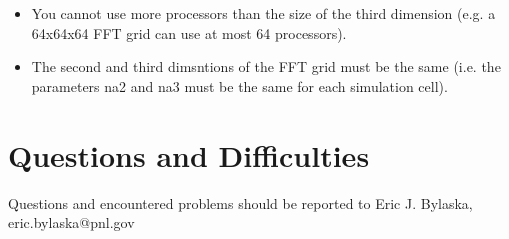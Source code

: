 \begin{itemize}
\item You cannot use more processors than the size of the third dimension (e.g. a 64x64x64 FFT grid
      can use at most 64 processors).
\item The second and third dimsntions of the FFT grid must be the same (i.e. the parameters na2 and 
      na3 must be the same for each simulation cell).
\end{itemize}


\section{Questions and Difficulties}

Questions and encountered problems should be reported to 
Eric J. Bylaska, eric.bylaska@pnl.gov




